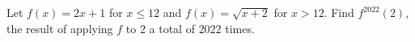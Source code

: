 Let $f(x)=2x+1$ for $x\le12$ and $f(x)=\sqrt{x+2}$ for $x>12$. Find $f^{2022}(2)$, the result of applying $f$ to $2$ a total of $2022$ times.
